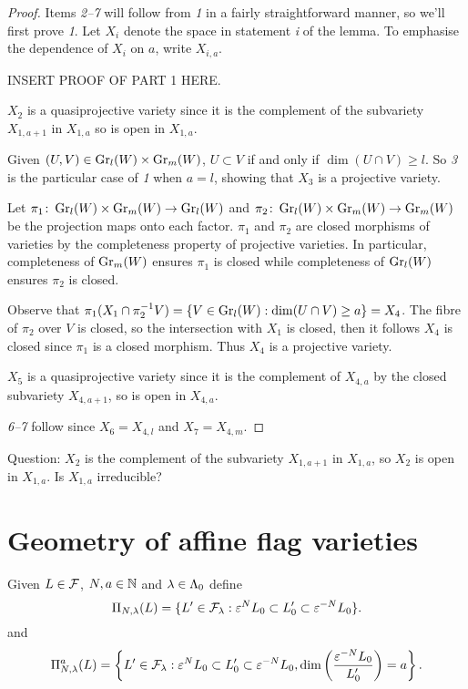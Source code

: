 \documentclass[a4paper, 11pt]{report}
\begin{document}
\begin{proof}
Items \emph{2--7} will follow from \emph{1} in a fairly straightforward manner, so we'll first prove \emph{1}. Let $X_i$ denote the space in statement \emph{i} of the lemma. To emphasise the dependence of $X_i$ on $a$, write $X_{i,a}$.

{\color{red}INSERT PROOF OF PART 1 HERE}.

$X_2$ is a quasiprojective variety since it is the complement of the subvariety $X_{1,a+1}$ in $X_{1,a}$ so is open in $X_{1,a}$.

Given $(U,V)\in\GR[l]{W}\times\GR[m]{W}$, $U\subset V$ if and only if $\dim(U\cap V) \geq l$. So \emph{3} is the particular case of \emph{1} when $a=l$, showing that $X_3$ is a projective variety.

Let $\pi_1\colon\GR[l]{W}\times\GR[m]{W}\to \GR[l]{W}$ and $\pi_2\colon\GR[l]{W}\times\GR[m]{W}\to\GR[m]{W}$ be the projection maps onto each factor. $\pi_1$ and $\pi_2$ are closed morphisms of varieties by the completeness property of projective varieties. In particular, completeness of $\GR[m]{W}$ ensures $\pi_1$ is closed while completeness of $\GR[l]{W}$ ensures $\pi_2$ is closed.

Observe that $\pi_1(X_1\cap\pi_2^{-1}{V}) = \{V\in\GR[l]{W}:\dim(U\cap V)\geq a\} = X_4$. The fibre of $\pi_2$ over $V$ is closed, so the intersection with $X_1$ is closed, then it follows $X_4$ is closed since $\pi_1$ is a closed morphism. Thus $X_4$ is a projective variety.

$X_5$ is a quasiprojective variety since it is the complement of $X_{4,a}$ by the closed subvariety $X_{4,a+1}$, so is open in $X_{4,a}$.

\emph{6--7} follow since $X_6 = X_{4,l}$ and $X_7 = X_{4,m}$.
\end{proof}

{\color{red}Question: $X_2$ is the complement of the subvariety $X_{1,a+1}$ in $X_{1,a}$, so $X_2$ is open in $X_{1,a}$. Is $X_{1,a}$ irreducible?}

\section{Geometry of affine flag varieties}

Given $L\in\flags$, $N,a\in\naturals$ and $\lambda\in\compositions$ define
\begin{equation*}
\Pi_{N,\lambda}(L) = \{L'\in\flags_\lambda: \epsilon^N L_0\subset L_0'\subset \epsilon^{-N}L_0\}.
\end{equation*}
and
\begin{equation*}
\Pi_{N,\lambda}^a(L) = \left\{L'\in\flags_\lambda: \epsilon^N L_0\subset L_0'\subset \epsilon^{-N}L_0, \dim\left(\frac{\epsilon^{-N}L_0}{L_0'}\right) = a\right\}.
\end{equation*}
\end{document}
